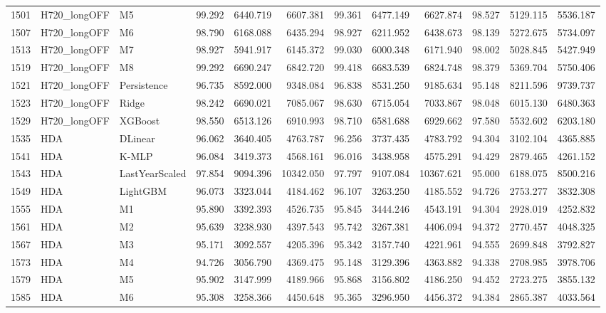 \begin{tabular}{lllrrrrrrrrr}
1501 & H720_longOFF & M5 & 99.292 & 6440.719 & 6607.381 & 99.361 & 6477.149 & 6627.874 & 98.527 & 5129.115 & 5536.187 \\
1507 & H720_longOFF & M6 & 98.790 & 6168.088 & 6435.294 & 98.927 & 6211.952 & 6438.673 & 98.139 & 5272.675 & 5734.097 \\
1513 & H720_longOFF & M7 & 98.927 & 5941.917 & 6145.372 & 99.030 & 6000.348 & 6171.940 & 98.002 & 5028.845 & 5427.949 \\
1519 & H720_longOFF & M8 & 99.292 & 6690.247 & 6842.720 & 99.418 & 6683.539 & 6824.748 & 98.379 & 5369.704 & 5750.406 \\
1521 & H720_longOFF & Persistence & 96.735 & 8592.000 & 9348.084 & 96.838 & 8531.250 & 9185.634 & 95.148 & 8211.596 & 9739.737 \\
1523 & H720_longOFF & Ridge & 98.242 & 6690.021 & 7085.067 & 98.630 & 6715.054 & 7033.867 & 98.048 & 6015.130 & 6480.363 \\
1529 & H720_longOFF & XGBoost & 98.550 & 6513.126 & 6910.993 & 98.710 & 6581.688 & 6929.662 & 97.580 & 5532.602 & 6203.180 \\
1535 & HDA & DLinear & 96.062 & 3640.405 & 4763.787 & 96.256 & 3737.435 & 4783.792 & 94.304 & 3102.104 & 4365.885 \\
1541 & HDA & K-MLP & 96.084 & 3419.373 & 4568.161 & 96.016 & 3438.958 & 4575.291 & 94.429 & 2879.465 & 4261.152 \\
1543 & HDA & LastYearScaled & 97.854 & 9094.396 & 10342.050 & 97.797 & 9107.084 & 10367.621 & 95.000 & 6188.075 & 8500.216 \\
1549 & HDA & LightGBM & 96.073 & 3323.044 & 4184.462 & 96.107 & 3263.250 & 4185.552 & 94.726 & 2753.277 & 3832.308 \\
1555 & HDA & M1 & 95.890 & 3392.393 & 4526.735 & 95.845 & 3444.246 & 4543.191 & 94.304 & 2928.019 & 4252.832 \\
1561 & HDA & M2 & 95.639 & 3238.930 & 4397.543 & 95.742 & 3267.381 & 4406.094 & 94.372 & 2770.457 & 4048.325 \\
1567 & HDA & M3 & 95.171 & 3092.557 & 4205.396 & 95.342 & 3157.740 & 4221.961 & 94.555 & 2699.848 & 3792.827 \\
1573 & HDA & M4 & 94.726 & 3056.790 & 4369.475 & 95.148 & 3129.396 & 4363.882 & 94.338 & 2708.985 & 3978.706 \\
1579 & HDA & M5 & 95.902 & 3147.999 & 4189.966 & 95.868 & 3156.802 & 4186.250 & 94.452 & 2723.275 & 3855.132 \\
1585 & HDA & M6 & 95.308 & 3258.366 & 4450.648 & 95.365 & 3296.950 & 4456.372 & 94.384 & 2865.387 & 4033.564 \\

\end{tabular}
